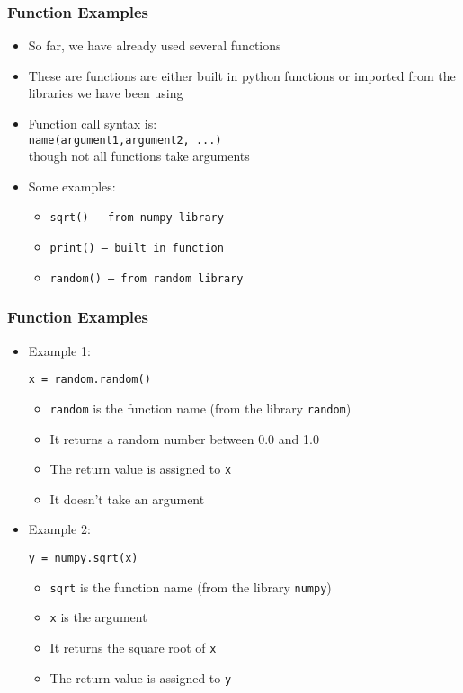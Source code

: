 \documentclass[english,14pt]{beamer}
\begin{document}
\begin{frame}
\frametitle{Function Examples}
\begin{itemize}
\item So far, we have already used several functions
\item These are functions are either built in python functions or imported from the libraries we have been using
\item Function call syntax is:\\
{\small \texttt{name(argument1,argument2, ...)} } \\
 though not all functions take arguments 
\item Some examples:
	\begin{itemize}
		\item \texttt{sqrt()  \;\;\;\; -- from numpy library}
		\item \texttt{print() \;\; -- built in function}
		\item \texttt{random()  \;\; -- from random library}
	\end{itemize}
\end{itemize}
\end{frame}



\begin{frame}[fragile]
\frametitle{Function Examples}
\begin{itemize}
\item Example 1:
\begin{lstlisting}[style=CStyle]
x = random.random()
\end{lstlisting}
	\begin{itemize}
		\item \texttt{random} is the function name (from the library \texttt{random})
		\item It returns a random number between 0.0 and 1.0
		\item The return value is assigned to \texttt{x}
		\item It doesn't take an argument 	
	\end{itemize}
\pause
\item Example 2:
\begin{lstlisting}[style=CStyle]
y = numpy.sqrt(x)
\end{lstlisting}
	\begin{itemize}
		\item \texttt{sqrt} is the function name (from the library \texttt{numpy})
		\item \texttt{x} is the argument
		\item It returns the square root of \texttt{x}
		\item The return value is assigned to \texttt{y}
	\end{itemize}
\end{itemize}
\end{frame}
\end{document}
